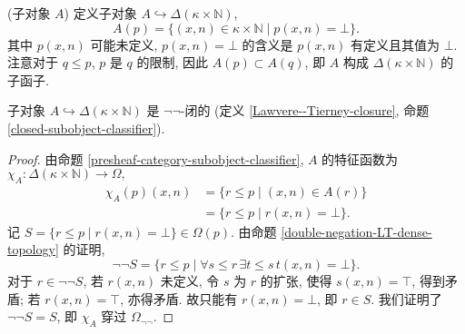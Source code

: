 \begin{definition}
	{(子对象 $A$)}
	定义子对象 $A\hookrightarrow \Delta(\kappa\times\mathbb{N})$,
	$$
	A(p) = \{(x,n)\in\kappa\times\mathbb{N}\mid p(x,n)=\bot\}.
	$$
	其中 $p(x,n)$ 可能未定义, $p(x,n)=\bot$ 的含义是 $p(x,n)$ 有定义且其值为 $\bot$.
	注意对于 $q\leq p$, $p$ 是 $q$ 的限制, 因此 $A(p)\subset A(q)$, 即 $A$ 构成 $\Delta(\kappa\times\mathbb{N})$ 的子函子.
\end{definition}

\begin{prop}
	{}
	子对象 $A\hookrightarrow \Delta(\kappa\times\mathbb{N})$ 是 $\neg\neg$-闭的 (定义 \ref{Lawvere--Tierney-closure}, 命题 \ref{closed-subobject-classifier}).
\end{prop}
\begin{proof}
	由命题 \ref{presheaf-category-subobject-classifier}, $A$ 的特征函数为
	$\chi_A\colon \Delta(\kappa\times\mathbb{N})\to\Omega,$
	\begin{align*}
		\chi_A(p)(x,n) &=
		\{r\leq p\mid (x,n)\in A(r)\}\\
		&= \{r\leq p\mid r(x,n)=\bot\}.
	\end{align*}
	记 $S=\{r\leq p\mid r(x,n)=\bot\}\in\Omega(p)$. 由命题 \ref{double-negation-LT-dense-topology} 的证明,
	$$
		\neg\neg S=\{r\leq p\mid \forall s\leq r\,\exists t\leq s\,t(x,n)=\bot\}.
	$$
	对于 $r\in\neg\neg S$, 若 $r(x,n)$ 未定义, 令 $s$ 为 $r$ 的扩张, 使得 $s(x,n)=\top$, 得到矛盾; 若 $r(x,n)=\top$, 亦得矛盾. 故只能有 $r(x,n)=\bot$, 即 $r\in S$. 我们证明了 $\neg\neg S=S$, 即 $\chi_A$ 穿过 $\Omega_{\neg\neg}$.
\end{proof}

